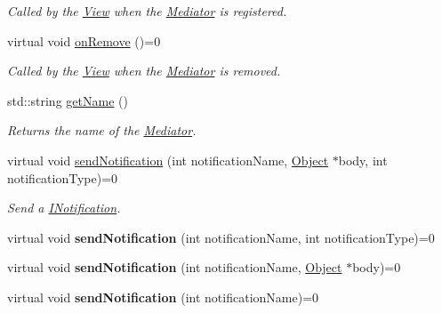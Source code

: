 \begin{DoxyCompactItemize}
\begin{DoxyCompactList}\small\item\em Called by the \hyperlink{class_pure_m_v_c_1_1_view}{View} when the \hyperlink{class_pure_m_v_c_1_1_mediator}{Mediator} is registered. \item\end{DoxyCompactList}\item 
virtual void \hyperlink{class_pure_m_v_c_1_1_mediator_a2fc2d7f514cb9a8b25d40185157c7a48}{onRemove} ()=0
\begin{DoxyCompactList}\small\item\em Called by the \hyperlink{class_pure_m_v_c_1_1_view}{View} when the \hyperlink{class_pure_m_v_c_1_1_mediator}{Mediator} is removed. \item\end{DoxyCompactList}\item 
std::string \hyperlink{class_pure_m_v_c_1_1_mediator_afefe595d1283eb6ae844263d1c95787c}{getName} ()
\begin{DoxyCompactList}\small\item\em Returns the name of the \hyperlink{class_pure_m_v_c_1_1_mediator}{Mediator}. \item\end{DoxyCompactList}\item 
virtual void \hyperlink{class_pure_m_v_c_1_1_i_notifier_a65e8333ccfea74138b79f84dac96af25}{sendNotification} (int notificationName, \hyperlink{class_pure_m_v_c_1_1_object}{Object} $\ast$body, int notificationType)=0
\begin{DoxyCompactList}\small\item\em Send a {\ttfamily \hyperlink{class_pure_m_v_c_1_1_i_notification}{INotification}}. \item\end{DoxyCompactList}\item 
\hypertarget{class_pure_m_v_c_1_1_i_notifier_ad9421945c1e0fd6d7ebbc136f9ecfba3}{
virtual void {\bfseries sendNotification} (int notificationName, int notificationType)=0}
\label{class_pure_m_v_c_1_1_i_notifier_ad9421945c1e0fd6d7ebbc136f9ecfba3}

\item 
\hypertarget{class_pure_m_v_c_1_1_i_notifier_a4d6bac0719be96948e4f7417489daeaa}{
virtual void {\bfseries sendNotification} (int notificationName, \hyperlink{class_pure_m_v_c_1_1_object}{Object} $\ast$body)=0}
\label{class_pure_m_v_c_1_1_i_notifier_a4d6bac0719be96948e4f7417489daeaa}

\item 
\hypertarget{class_pure_m_v_c_1_1_i_notifier_aca921608a2ced017a8face049fc7c6af}{
virtual void {\bfseries sendNotification} (int notificationName)=0}
\label{class_pure_m_v_c_1_1_i_notifier_aca921608a2ced017a8face049fc7c6af}


\end{DoxyCompactItemize}
